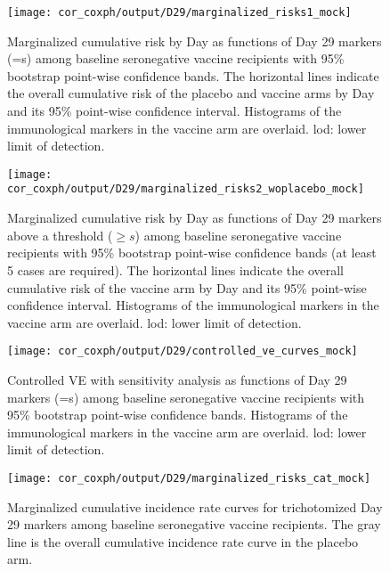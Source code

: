 \documentclass[]{book}
\theoremstyle{definition}
\theoremstyle{definition}
\theoremstyle{definition}
\newcommand{\1}{\mathbbm{1}}
\begin{document}
\begin{figure}[H]
    \centering
    \texttt{[image: cor\_coxph/output/D29/marginalized\_risks1\_mock]}
    \caption{Marginalized cumulative risk by Day \protect as functions of Day 29 markers (=s) among baseline seronegative vaccine recipients with 95\% bootstrap point-wise confidence bands. The horizontal lines indicate the overall cumulative risk of the placebo and vaccine arms by Day \protect and its 95\% point-wise confidence interval. Histograms of the immunological markers in the vaccine arm are overlaid. lod: lower limit of detection.}
\end{figure}
\begin{figure}[H]
    \centering
    \texttt{[image: cor\_coxph/output/D29/marginalized\_risks2\_woplacebo\_mock]}
    \caption{Marginalized cumulative risk by Day \protect as functions of Day 29 markers above a threshold ($\geq s$) among baseline seronegative vaccine recipients with 95\% bootstrap point-wise confidence bands (at least 5 cases are required). The horizontal lines indicate the overall cumulative risk of the vaccine arm by Day \protect and its 95\% point-wise confidence interval. Histograms of the immunological markers in the vaccine arm are overlaid. lod: lower limit of detection.}
\end{figure}
\begin{figure}[H]
    \centering
    \texttt{[image: cor\_coxph/output/D29/controlled\_ve\_curves\_mock]}
    \caption{Controlled VE with sensitivity analysis as functions of Day 29 markers (=s) among baseline seronegative vaccine recipients with 95\% bootstrap point-wise confidence bands. Histograms of the immunological markers in the vaccine arm are overlaid. lod: lower limit of detection.}
\end{figure}

\begin{figure}[H]
    \centering
    \texttt{[image: cor\_coxph/output/D29/marginalized\_risks\_cat\_mock]}
    \caption{Marginalized cumulative incidence rate curves for trichotomized Day 29 markers among baseline seronegative vaccine recipients. The gray line is the overall cumulative incidence rate curve in the placebo arm.}
\end{figure}
\end{document}
